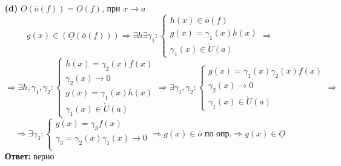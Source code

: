 \documentclass[a4paper]{article}
\newcommand{\case}[1]{\begin{cases} #1 \end{cases}}
\renewcommand{\r}{\Rightarrow}
\newcommand{\OO}{\underline{O}}
\newcommand{\oo}{\overline{o}}
\begin{document}
\begin{enumerate}
\begin{enumerate}
        \item[\textbf{(d)}]$\OO(\oo(f)) = \OO(f)$, при $x \to a$
        $$g(x) \in (\OO(\oo(f))) \r \exists h \exists \gamma_1 : \case{
            h(x) \in \oo(f)\\
            g(x) = \gamma_1(x)h(x) \\
            \gamma_1(x) \in \mathring{U}(a)
        }\r $$
        $$\r \exists h, \gamma_1, \gamma_2 : \case{
            h(x) = \gamma_2(x)f(x)\\
            \gamma_2(x) \to 0 \\
            g(x) = \gamma_1(x)h(x) \\
            \gamma_1(x) \in \mathring{U}(a)
        }\r \exists \gamma_1, \gamma_2 : \case{
            g(x) = \gamma_1(x)\gamma_2(x)f(x) \\
            \gamma_2(x) \to 0 \\
            \gamma_1(x) \in \mathring{U}(a)
        } \r$$
        $$\r \exists \gamma_3 : \case{
            g(x) = \gamma_3f(x) \\
            \gamma_3 = \gamma_2(x)\gamma_1(x) \to 0 \\
        } \r g(x) \in \oo \text{ по опр.}\r g(x) \in \OO$$
        \textbf{Ответ:} верно \\


\end{enumerate}
\end{enumerate}
\end{document}
